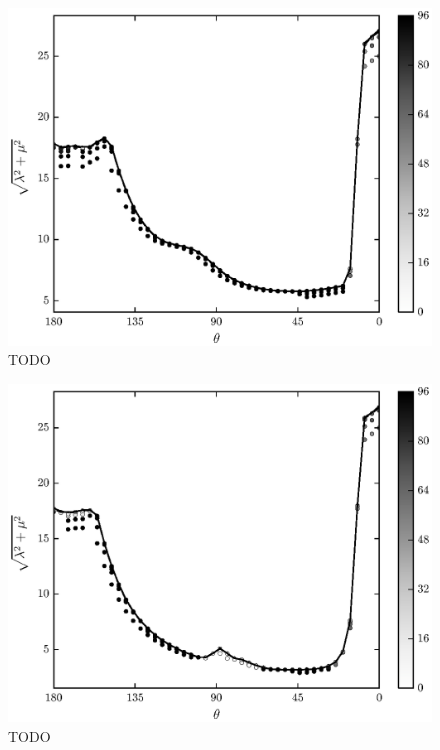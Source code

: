 	\begin{figure}
		\begin{center}
			\includegraphics{./fig/ch3/pull/eb0.01/grid.eps}
		\end{center}		
		\caption{ TODO
		\label{fig:PullGrid:eb0.01}}
	\end{figure}
	
	\begin{figure}
		\begin{center}
			\includegraphics{./fig/ch3/pull/eb0/grid.eps}
		\end{center}		
		\caption{ TODO
		\label{fig:PullGrid:eb0}}
	\end{figure}
	
